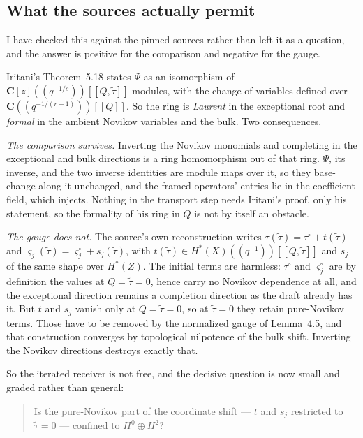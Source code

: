 \documentclass[11pt]{article}
\theoremstyle{definition}
\theoremstyle{remark}
\newcommand{\C}{\mathbf C}
\begin{document}
\subsection*{What the sources actually permit}

I have checked this against the pinned sources rather than left it as a
question, and the answer is positive for the comparison and negative for the
gauge.

Iritani's Theorem~5.18 states $\Psi$ as an isomorphism of
$\C[z](\!(q^{-1/s})\!)[[Q,\widetilde\tau]]$-modules, with the change of
variables defined over $\C(\!(q^{-1/(r-1)})\!)[[Q]]$. So the ring is
\emph{Laurent} in the exceptional root and \emph{formal} in the ambient Novikov
variables and the bulk. Two consequences.

\emph{The comparison survives.} Inverting the Novikov monomials and completing
in the exceptional and bulk directions is a ring homomorphism out of that ring.
$\Psi$, its inverse, and the two inverse identities are module maps over it, so
they base-change along it unchanged, and the framed operators' entries lie in
the coefficient field, which injects. Nothing in the transport step needs
Iritani's proof, only his statement, so the formality of his ring in $Q$ is not
by itself an obstacle.

\emph{The gauge does not.} The source's own reconstruction writes
$\tau(\widetilde\tau)=\tau^\circ+t(\widetilde\tau)$ and
$\varsigma_j(\widetilde\tau)=\varsigma_j^\circ+s_j(\widetilde\tau)$, with
$t(\widetilde\tau)\in H^*(X)(\!(q^{-1})\!)[[Q,\widetilde\tau]]$ and $s_j$ of the
same shape over $H^*(Z)$. The initial terms are harmless: $\tau^\circ$ and
$\varsigma_j^\circ$ are by definition the values at $Q=\widetilde\tau=0$, hence
carry no Novikov dependence at all, and the exceptional direction remains a
completion direction as the draft already has it. But $t$ and $s_j$ vanish only
at $Q=\widetilde\tau=0$, so at $\widetilde\tau=0$ they retain pure-Novikov
terms. Those have to be removed by the normalized gauge of Lemma~4.5, and that
construction converges by topological nilpotence of the bulk shift. Inverting
the Novikov directions destroys exactly that.

So the iterated receiver is not free, and the decisive question is now small and
graded rather than general:

\begin{quote}
  Is the pure-Novikov part of the coordinate shift --- $t$ and $s_j$ restricted
  to $\widetilde\tau=0$ --- confined to $H^0\oplus H^2$?
\end{quote}
\end{document}
